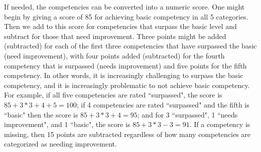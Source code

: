 If needed, the competencies can be converted into a numeric score. 
One might begin by giving a score of 85 for achieving basic competency in all 5 categories.
Then we add to this score for competencies that surpass the basic level and subtract for 
those that need improvement.
Three points might be added (subtracted) for each of the first three competencies that 
have surpassed the basic (need improvement), with
four points added (subtracted) for the fourth competency that is surpassed (needs improvement) 
and five points for the fifth competency. 
In other words, it is increasingly challenging to surpass the basic competency, 
and it is increasingly problematic to not achieve basic competency.
For example, if all five competencies
are rated ``surpassed", the score is $85 + 3*3 +4 + 5 = 100$; 
if 4 competencies are rated ``surpassed" and the fifth is ``basic" then the score is $85 + 3*3 +4 = 95$;  and for 3  ``surpassed", 1 
``needs improvement", and 1 ``basic", the score is $85 + 3*3 - 3 = 91$.
If a competency is missing, then 15 points are subtracted regardless of how many 
competencies are categorized as needing improvement.
